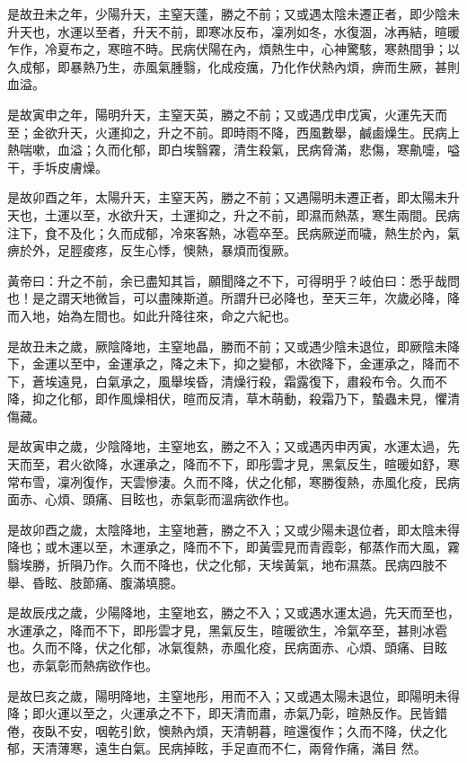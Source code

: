 是故丑未之年，少陽升天，主窒天蓬，勝之不前；又或遇太陰未遷正者，即少陰未升天也，水運以至者，升天不前，即寒冰反布，凜冽如冬，水復涸，冰再結，暄暖乍作，冷夏布之，寒暄不時。民病伏陽在內，煩熱生中，心神驚駭，寒熱間爭；以久成郁，即暴熱乃生，赤風氣腫翳，化成疫癘，乃化作伏熱內煩，痹而生厥，甚則血溢。

是故寅申之年，陽明升天，主窒天英，勝之不前；又或遇戊申戊寅，火運先天而至；金欲升天，火運抑之，升之不前。即時雨不降，西風數舉，鹹鹵燥生。民病上熱喘嗽，血溢；久而化郁，即白埃翳霧，清生殺氣，民病脅滿，悲傷，寒鼽嚏，嗌干，手坼皮膚燥。

是故卯酉之年，太陽升天，主窒天芮，勝之不前；又遇陽明未遷正者，即太陽未升天也，土運以至，水欲升天，土運抑之，升之不前，即濕而熱蒸，寒生兩間。民病注下，食不及化；久而成郁，冷來客熱，冰雹卒至。民病厥逆而噦，熱生於內，氣痹於外，足脛痠疼，反生心悸，懊熱，暴煩而復厥。

黃帝曰：升之不前，余已盡知其旨，願聞降之不下，可得明乎？岐伯曰：悉乎哉問也！是之謂天地微旨，可以盡陳斯道。所謂升已必降也，至天三年，次歲必降，降而入地，始為左間也。如此升降往來，命之六紀也。

是故丑未之歲，厥陰降地，主窒地晶，勝而不前；又或遇少陰未退位，即厥陰未降下，金運以至中，金運承之，降之未下，抑之變郁，木欲降下，金運承之，降而不下，蒼埃遠見，白氣承之，風舉埃昏，清燥行殺，霜露復下，肅殺布令。久而不降，抑之化郁，即作風燥相伏，暄而反清，草木萌動，殺霜乃下，蟄蟲未見，懼清傷藏。

是故寅申之歲，少陰降地，主窒地玄，勝之不入；又或遇丙申丙寅，水運太過，先天而至，君火欲降，水運承之，降而不下，即彤雲才見，黑氣反生，暄暖如舒，寒常布雪，凜冽復作，天雲慘淒。久而不降，伏之化郁，寒勝復熱，赤風化疫，民病面赤、心煩、頭痛、目眩也，赤氣彰而溫病欲作也。

是故卯酉之歲，太陰降地，主窒地蒼，勝之不入；又或少陽未退位者，即太陰未得降也；或木運以至，木運承之，降而不下，即黃雲見而青霞彰，郁蒸作而大風，霧翳埃勝，折隕乃作。久而不降也，伏之化郁，天埃黃氣，地布濕蒸。民病四肢不舉、昏眩、肢節痛、腹滿填臆。

是故辰戌之歲，少陽降地，主窒地玄，勝之不入；又或遇水運太過，先天而至也，水運承之，降而不下，即彤雲才見，黑氣反生，暄暖欲生，冷氣卒至，甚則冰雹也。久而不降，伏之化郁，冰氣復熱，赤風化疫，民病面赤、心煩、頭痛、目眩也，赤氣彰而熱病欲作也。

是故巳亥之歲，陽明降地，主窒地彤，用而不入；又或遇太陽未退位，即陽明未得降；即火運以至之，火運承之不下，即天清而肅，赤氣乃彰，暄熱反作。民皆錯倦，夜臥不安，咽乾引飲，懊熱內煩，天清朝暮，暄還復作；久而不降，伏之化郁，天清薄寒，遠生白氣。民病掉眩，手足直而不仁，兩脅作痛，滿目 然。

